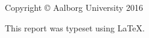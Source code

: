 \thispagestyle{empty}
{\small
\strut\vfill
\noindent Copyright \copyright{} Aalborg University 2016\par
\vspace{0.2cm}
\noindent This report was typeset using \LaTeX.}
\clearpage